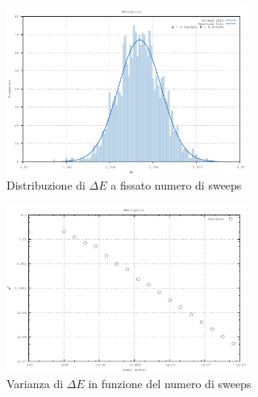 \begin{figure}[H]
\centering
\includegraphics[width=0.7\textwidth]{histogram}
\caption{Distribuzione di $\Delta E$ a fissato numero di sweeps}
\label{fig:histogram}
\end{figure}
\begin{figure}[H]
\centering
\includegraphics[width=0.7\textwidth]{variance}
\caption{Varianza di $\Delta E$ in funzione del numero di sweeps}
\label{fig:variance}
\end{figure}

